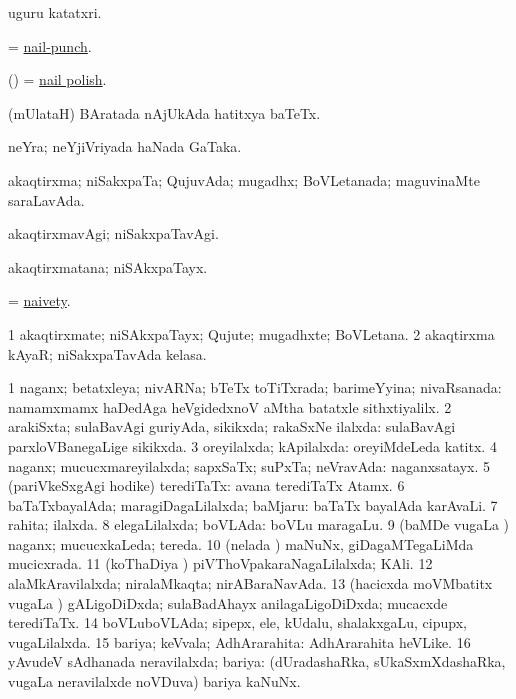 \bentry
{}
\gl{\nA}
\bmng
uguru katatxri. 
\emng
\eentry

\bentry
{}
\gl{\nA}
\bmng
= \hyperlink{nail-punch}{nail-punch}.
\emng
\eentry

\bentry
{}
\gl{\nA}
\bmng
(\birx) = \hyperlink{nail polish}{nail polish}.
\emng
\eentry

\bentry
{}
\gl{\nA}
\bmng
(mUlataH) BAratada nAjUkAda hatitxya baTeTx. 
\emng
\eentry

\bentry
{}
\gl{\nA}
\bmng
neYra; neYjiVriyada haNada GaTaka. 
\emng
\eentry

\bentry
{}
\gl{\gu}
\bmng
akaqtirxma; niSakxpaTa; QujuvAda; mugadhx; BoVLetanada; maguvinaMte saraLavAda. 
\emng
\eentry

\bentry
{}
\gl{\kirxvi}
\bmng
akaqtirxmavAgi; niSakxpaTavAgi. 
\emng
\eentry

\bentry
{}
\gl{\nA}
\bmng
akaqtirxmatana; niSAkxpaTayx. 
\emng
\eentry

\bentry
{}
\gl{\nA}
\bmng
= \hyperlink{naivety}{naivety}.
\emng
\eentry

\bentry
{}
\gl{\nA}
\bmng
\bnum
\num{1} akaqtirxmate; niSAkxpaTayx; Qujute; mugadhxte; BoVLetana. 
\num{2} akaqtirxma kAyaR; niSakxpaTavAda kelasa. 
\enum
\emng
\eentry

\bentry
{}
\gl{\gu}
\bmng
\bnum
\num{1} naganx; betatxleya; nivARNa; bTeTx toTiTxrada; barimeYyina; nivaRsanada:  namamxmamx haDedAga heVgidedxnoV aMtha batatxle sithxtiyalilx. 
\num{2} arakiSxta; sulaBavAgi guriyAda, sikikxda; rakaSxNe ilalxda:  sulaBavAgi parxloVBanegaLige sikikxda. 
\num{3} oreyilalxda; kApilalxda:  oreyiMdeLeda katitx. 
\num{4} naganx; mucucxmareyilalxda; sapxSaTx; suPxTa; neVravAda:  naganxsatayx. 
\num{5} (pariVkeSxgAgi hodike) terediTaTx:  avana terediTaTx Atamx. 
\num{6} baTaTxbayalAda; maragiDagaLilalxda; baMjaru:  baTaTx bayalAda karAvaLi. 
\num{7} rahita; ilalxda. 
\num{8} elegaLilalxda; boVLAda:  boVLu maragaLu. 
\num{9} (baMDe \mo vugaLa \vi) naganx; mucucxkaLeda; tereda. 
\num{10} (nelada \vi) maNuNx, giDagaMTegaLiMda mucicxrada. 
\num{11} (koThaDiya \vi) piVThoVpakaraNagaLilalxda; KAli. 
\num{12} alaMkAravilalxda; niralaMkaqta; nirABaraNavAda. 
\num{13} (hacicxda moVMbatitx \mo vugaLa \vi) gALigoDiDxda; sulaBadAhayx anilagaLigoDiDxda; mucacxde terediTaTx. 
\num{14} boVLuboVLAda; sipepx, ele, kUdalu, shalakxgaLu, cipupx, \mo vugaLilalxda. 
\num{15} bariya; keVvala; AdhArarahita:  AdhArarahita heVLike. 
\num{16} yAvudeV sAdhanada neravilalxda; bariya:  (dUradashaRka, sUkaSxmXdashaRka, \mo vugaLa neravilalxde noVDuva) bariya kaNuNx. 
\enum
\emng
\eentry

